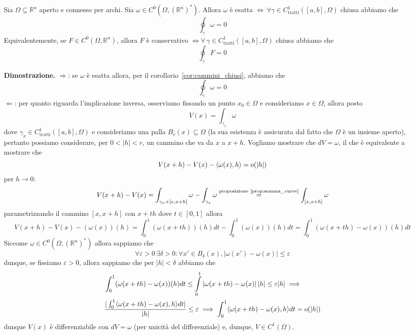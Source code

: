 \vspace{0.5cm}
\begin{theorem}[\textcolor{blue}{CF1}]
Sia $\Omega \subseteq \mathbb{R}^n$ aperto e connesso per archi. Sia $\omega \in C^0(\Omega, (\mathbb{R}^n)^*)$. Allora $\omega$ è esatta $\iff \, \forall \gamma \in C^1_\text{tratti} ([a, b], \Omega)$ chiusa abbiamo che
$$
\oint_\gamma \omega = 0
$$
Equivalentemente, se $F \in C^0(\Omega, \mathbb{R}^n)$, allora $F$ è conservativo $\iff \forall \, \gamma \in C^1_\text{tratti}([a, b], \Omega)$ chiusa abbiamo che
$$
\oint_\gamma F = 0
$$
\label{thm:teo_cf1}
\end{theorem}

\noindent \textbf{Dimostrazione. }
$\boxed{\Rightarrow}$: se $\omega$ è esatta allora, per il corollario~\ref{cor:cammini_chiusi}, abbiamo che
$$
\oint_\gamma \omega = 0
$$
$\boxed{\Leftarrow}$: per quanto riguarda l'implicazione inversa, osserviamo fissando un punto $x_0 \in \Omega$ e consideriamo $x \in \Omega$, allora posto
$$
V(x) = \int_{\gamma_x} \omega
$$
dove $\gamma_x \in C^1_\text{tratti}([a, b], \Omega)$ e consideriamo una palla $B_r(x) \subseteq \Omega$ (la sua esistenza è assicurata dal fatto che $\Omega$ è un insieme aperto), pertanto possiamo considerare, per $0 < |h| < r$, un cammino che va da $x$ a $x+h$. Vogliamo mostrare che $dV =\omega$, il che è equivalente a mostrare che $$V(x+h) - V(x) - \langle \omega(x), h \rangle = o(|h|)$$ per $h \to 0$:
$$
V(x+h) - V(x) = \int_{\gamma_x + [x, x+h]} \omega - \int_{\gamma_x} \omega \stackrel{\text{proposizione~\ref{prop:somma_curve}}}{=} \int_{[x, x+h]} \omega
$$
parametrizzando il cammino $[x, x+h]$ con $x + th$ dove $t \in [0,1]$ allora
$$
V(x+h)-V(x) - (\omega(x))(h) = \int_0^1 (\omega(x + th))(h) dt - \int_0^1 (\omega(x))(h) dt = \int_0^1 (\omega(x + th) - \omega(x))(h)dt
$$
Siccome $\omega \in C^0(\Omega, (\mathbb{R}^n)^*)$ allora sappiamo che
$$
\forall \varepsilon > 0 \, \exists \delta > 0: \forall x' \in B_\delta(x), |\omega(x') - \omega(x)| \leq \varepsilon
$$
dunque, se fissiamo $\varepsilon > 0$, allora sappiamo che per $|h| < \delta$ abbiamo che
\begin{align*}
&\int_0^1 (\omega(x + th) - \omega(x))(h)dt \leq \int\limits_0^1 |\omega(x + th) - \omega(x) | \, |h| \leq \varepsilon |h| \implies \\
&\frac{|\int_0^1 \langle \omega(x + th) - \omega(x), h \rangle dt|}{|h|} \leq \varepsilon \implies \int_0^1 \langle \omega(x + th) - \omega(x), h \rangle dt = o(|h|) 
\end{align*}
dunque $V(x)$ è differenziabile con $dV = \omega$ (per unicità del differenziale) e, dunque, $V \in C^1(\Omega)$. \\
